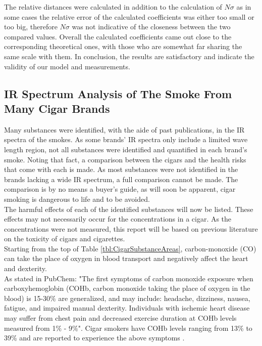 \documentclass[reprint,amsmath,amssymb,aps, prl,superscriptaddress]{revtex4-2}
\begin{document}
The relative distances were calculated in addition to the calculation of $N\sigma$ as
in some cases the relative error of the calculated coefficients was either too small or too big, therefore $N\sigma$ was not indicative of the closeness between the two compared values. Overall the calculated coefficients came out close to the corresponding theoretical ones, with those who are somewhat far sharing the same scale with them. In conclusion, the results are satisfactory and indicate the validity of our model and measurements.

\subsection{IR Spectrum Analysis of The Smoke From Many Cigar Brands}
Many substances were identified, with the aide of past publications, in the IR spectra of the smokes. As some brands' IR spectra only include a limited wave length region, not all substances were identified and quantified in each brand's smoke.
Noting that fact, a comparison between the cigars and the health risks that come with each is made. As most substances were not identified in the brands lacking a wide IR spectrum, a full comparison cannot be made. The comparison is by no means a buyer's guide, as will soon be apparent, cigar smoking is dangerous to life and to be avoided.\\
The harmful effects of each of the identified substances will now be listed. These effects may not necessarily occur for the concentrations in a cigar. As the concentrations were not measured, this report will be based on previous literature on the toxicity of cigars and cigarettes.\\
Starting from the top of Table \ref{tbl:CigarSubstanceAreas}, carbon-monoxide (CO) can take the place of oxygen in blood transport and negatively affect the heart \cite{SubstanceDangerPaper} and dexterity.\\
As stated in PubChem\cite{PubChemCO}: "The first symptoms of carbon monoxide exposure when carboxyhemoglobin (COHb, carbon monoxide taking the place of oxygen in the blood) is 15-30$\%$ are generalized, and may include: headache, dizziness, nausea, fatigue, and impaired manual dexterity. Individuals with ischemic heart disease may suffer from chest pain and decreased exercise duration at COHb levels measured from 1$\%$ - 9$\%$". Cigar smokers have COHb levels ranging from 13\% to 39\% and are reported to experience the above symptoms \cite{COHbInSmokers}.\\
\end{document}
